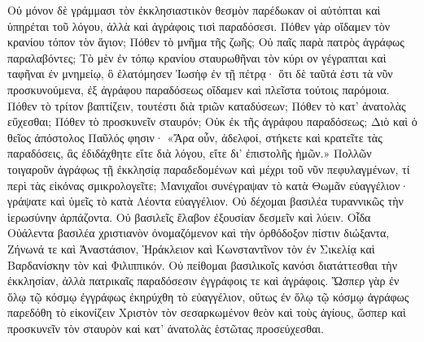 \documentclass[10pt]{book}
\newcommand{\switchGreek}[1][]{\selectlanguage{polutonikogreek} \switchcolumn*[#1]}
\newcommand{\switchEnglish}{\selectlanguage{english} \switchcolumn}
\begin{document}
\begin{paracol}{2}
\switchGreek

Οὐ μόνον δὲ γράμμασι τὸν ἐκκλησιαστικὸν θεσμὸν παρέδωκαν οἱ αὐτόπται καὶ
ὑπηρέται τοῦ λόγου, ἀλλὰ καὶ ἀγράφοις τισὶ παραδόσεσι. Πόθεν γὰρ οἴδαμεν
τὸν κρανίου τόπον τὸν ἅγιον; Πόθεν τὸ μνῆμα τῆς ζωῆς; Οὐ παῖς παρὰ πατρὸς
ἀγράφως παραλαβόντες; Τὸ μὲν ἐν τόπῳ κρανίου σταυρωθῆναι τὸν κύρι ον
γέγραπται καὶ ταφῆναι ἐν μνημείῳ, ὃ ἐλατόμησεν Ἰωσὴφ ἐν τῇ πέτρᾳ· ὅτι δὲ
ταῦτά ἐστι τὰ νῦν προσκυνούμενα, ἐξ ἀγράφου παραδόσεως οἴδαμεν καὶ πλεῖστα
τούτοις παρόμοια. Πόθεν τὸ τρίτον βαπτίζειν, τουτέστι διὰ τριῶν καταδύσεων;
Πόθεν τὸ κατ’ ἀνατολὰς εὔχεσθαι; Πόθεν τὸ προσκυνεῖν σταυρόν; Οὐκ ἐκ τῆς
ἀγράφου παραδόσεως; Διὸ καὶ ὁ θεῖος ἀπόστολος Παῦλός φησιν· «Ἄρα οὖν,
ἀδελφοί, στήκετε καὶ κρατεῖτε τὰς παραδόσεις, ἃς ἐδιδάχθητε εἴτε διὰ λόγου,
εἴτε δι’ ἐπιστολῆς ἡμῶν.» Πολλῶν τοιγαροῦν ἀγράφως τῇ ἐκκλησίᾳ
παραδεδομένων καὶ μέχρι τοῦ νῦν πεφυλαγμένων, τί περὶ τὰς εἰκόνας
σμικρολογεῖτε; Μανιχαῖοι συνέγραψαν τὸ κατὰ Θωμᾶν εὐαγγέλιον· γράψατε καὶ
ὑμεῖς τὸ κατὰ Λέοντα εὐαγγέλιον. Οὐ δέχομαι βασιλέα τυραννικῶς τὴν
ἱερωσύνην ἁρπάζοντα. Οὐ βασιλεῖς ἔλαβον ἐξουσίαν δεσμεῖν καὶ λύειν. Οἶδα
Οὐάλεντα βασιλέα χριστιανὸν ὀνομαζόμενον καὶ τὴν ὀρθόδοξον πίστιν διώξαντα,
Ζήνωνά τε καὶ Ἀναστάσιον, Ἡράκλειον καὶ Κωνσταντῖνον τὸν ἐν Σικελίᾳ καὶ
Βαρδανίσκην τὸν καὶ Φιλιππικόν. Οὐ πείθομαι βασιλικοῖς κανόσι διατάττεσθαι
τὴν ἐκκλησίαν, ἀλλὰ πατρικαῖς παραδόσεσιν ἐγγράφοις τε καὶ ἀγράφοις. Ὥσπερ
γὰρ ἐν ὅλῳ τῷ κόσμῳ ἐγγράφως ἐκηρύχθη τὸ εὐαγγέλιον, οὕτως ἐν ὅλῳ τῷ κόσμῳ
ἀγράφως παρεδόθη τὸ εἰκονίζειν Χριστὸν τὸν σεσαρκωμένον θεὸν καὶ τοὺς
ἁγίους, ὥσπερ καὶ προσκυνεῖν τὸν σταυρὸν καὶ κατ’ ἀνατολὰς ἑστῶτας
προσεύχεσθαι.

\switchEnglish


\end{paracol}
\end{document}
